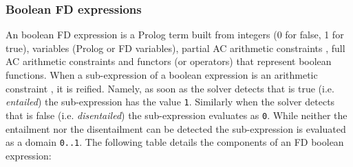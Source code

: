 \subsubsection{Boolean FD expressions}
\label{Boolean-FD-expressions}
An boolean FD expression is a Prolog term built from integers (0 for false,
1 for true), variables (Prolog or FD variables), partial AC arithmetic
constraints , full AC arithmetic constraints
 and functors (or operators) that represent
boolean functions. When a sub-expression of a boolean expression is an
arithmetic constraint , it is reified. Namely, as soon as the
solver detects that  is true (i.e. \emph{entailed}) the
sub-expression has the value \texttt{1}. Similarly when the solver detects
that  is false (i.e. \emph{disentailed}) the sub-expression
evaluates as \texttt{0}. While neither the entailment nor the disentailment
can be detected the sub-expression is evaluated as a domain \texttt{0..1}.
The following table details the components of an FD boolean expression:


